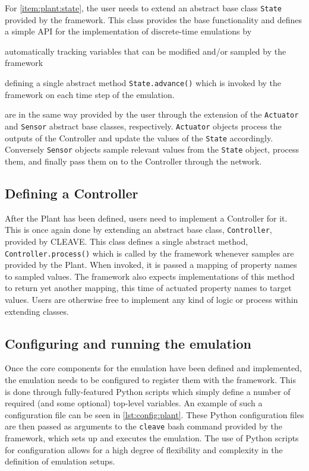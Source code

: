 For \cref{item:plant:state}, the user needs to extend an abstract base class \texttt{State} provided by the framework.
This class provides the base functionality and defines a simple API for the implementation of discrete-time emulations by
\begin{enumerate*}[itemjoin={{; }}, itemjoin*={{; and }}]
    \item automatically tracking variables that can be modified and/or sampled by the framework
    \item defining a single abstract method \texttt{State.advance()} which is invoked by the framework on each time step of the emulation.
\end{enumerate*}

 are in the same way provided by the user through the extension of the \texttt{Actuator} and \texttt{Sensor} abstract base classes, respectively.
\texttt{Actuator} objects process the outputs of the Controller and update the values of the \texttt{State} accordingly.
Conversely \texttt{Sensor} objects sample relevant values from the \texttt{State} object, process them, and finally pass them on to the Controller through the network.

\subsection{Defining a Controller}

After the Plant has been defined, users need to implement a Controller for it.
This is once again done by extending an abstract base class, \texttt{Controller}, provided by CLEAVE.
This class defines a single abstract method, \texttt{Controller.process()} which is called by the framework whenever samples are provided by the Plant.
When invoked, it is passed a mapping of property names to sampled values.
The framework also expects implementations of this method to return yet another mapping, this time of actuated property names to target values.
Users are otherwise free to implement any kind of logic or process within extending classes.

\subsection{Configuring and running the emulation}

Once the core components for the emulation have been defined and implemented, the emulation needs to be configured to register them with the framework.
This is done through fully-featured Python scripts which simply define a number of required (and some optional) top-level variables.
An example of such a configuration file can be seen in \cref{lst:config:plant}.
These Python configuration files are then passed as arguments to the \texttt{cleave} bash command provided by the framework, which sets up and executes the emulation.
The use of Python scripts for configuration allows for a high degree of flexibility and complexity in the definition of emulation setups.

